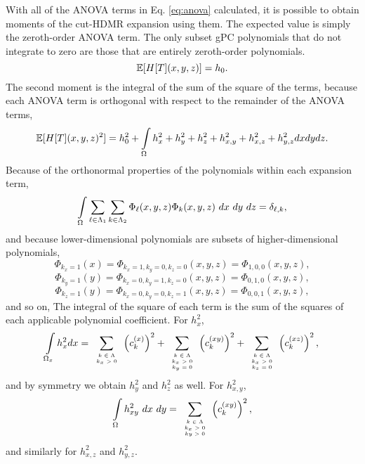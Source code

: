 With all of the ANOVA terms in Eq. \ref{eq:anova} calculated, it is possible to obtain
moments of the cut-HDMR expansion using them.
The expected value is simply the zeroth-order ANOVA term.  The only subset gPC polynomials
that do not integrate to zero are those that are entirely zeroth-order polynomials.
\begin{equation}
  \mathbb{E}[ H[T](x,y,z)] = h_0.
\end{equation}
The second moment is the integral of the sum of the square of the terms, because each ANOVA term is orthogonal
with respect to the remainder of the ANOVA terms,
\begin{equation}
  \mathbb{E}[ H[T](x,y,z)^2] = h_0^2 + \int\limits_{\Omega} h_x^2 + h_y^2 + h_z^2 + h_{x,y}^2 + h_{x,z}^2 + h_{y,z}^2 dx dy dz.
\end{equation}
Because of the orthonormal properties of the polynomials within each expansion term,
\begin{equation}
  \int\limits_{\Omega} \sum_{\ell\in\Lambda_1}\sum_{k\in\Lambda_2} \Phi_\ell(x,y,z)\Phi_k(x,y,z)\ dx\ dy\ dz = \delta_{\ell,k},
\end{equation}
and because lower-dimensional polynomials are subsets of higher-dimensional polynomials,
\begin{equation}
  \Phi_{k_x=1}(x) = \Phi_{k_x=1,k_y=0,k_z=0}(x,y,z) = \Phi_{1,0,0}(x,y,z),
\end{equation}
\begin{equation}
  \Phi_{k_y=1}(y) = \Phi_{k_x=0,k_y=1,k_z=0}(x,y,z) = \Phi_{0,1,0}(x,y,z),
\end{equation}
\begin{equation}
  \Phi_{k_z=1}(y) = \Phi_{k_x=0,k_y=0,k_z=1}(x,y,z) = \Phi_{0,0,1}(x,y,z),
\end{equation}
and so on,
The integral of the square of each term is the sum of the squares of each applicable polynomial coefficient.  
For $h_x^2$,
\begin{equation}
  \int\limits_{\Omega_{x}} h_x^2 dx = \sum_{\tiny\begin{array}{c}k\in\Lambda\\k_x>0\end{array}}^{}\left(c_k^{(x)}\right)^2 +
  \sum_{\tiny\begin{array}{c}k\in\Lambda\\k_x>0\\k_y=0\end{array}}^{} \left(c_k^{(xy)}\right)^2 + \sum_{\tiny\begin{array}{c}k\in\Lambda\\k_x>0\\k_z=0\end{array}}^{}
      \left(c_k^{(xz)}\right)^2,
\end{equation}
and by symmetry we obtain $h^2_y$ and $h^2_z$ as well.  For $h_{x,y}^2$,
\begin{equation}
  \int\limits_{\Omega} h_{xy}^2\ dx\ dy = \sum_{\tiny\begin{array}{c}k\in\Lambda\\k_x>0\\ky>0\end{array}}^{}\left(c_k^{(xy)}\right)^2,
\end{equation}
and similarly for $h_{x,z}^2$ and $h_{y,z}^2$.

